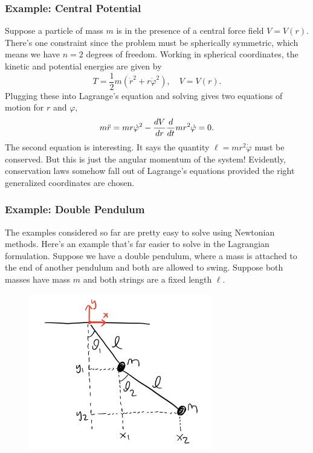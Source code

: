 \documentclass[
  letterpaper,
  DIV=11,
  numbers=noendperiod]{scrreprt}
\begin{document}
\hypertarget{example-central-potential}{%
\subsubsection{Example: Central
Potential}\label{example-central-potential}}

Suppose a particle of mass \(m\) is in the presence of a central force
field \(V=V(r)\). There's one constraint since the problem must be
spherically symmetric, which means we have \(n=2\) degrees of freedom.
Working in spherical coordinates, the kinetic and potential energies are
given by \[
T = \frac{1}{2} m (\dot r^2 + r \dot \varphi^2), \quad V = V(r).
\] Plugging these into Lagrange's equation and solving gives two
equations of motion for \(r\) and \(\varphi\), \[
m \ddot r = mr \dot\varphi^2 - \frac{dV}{dr}\\
\frac{d}{dt} mr^2 \dot\varphi = 0.
\] The second equation is interesting. It says the quantity
\(\ell = mr^2 \dot\varphi\) must be conserved. But this is just the
angular momentum of the system! Evidently, conservation laws somehow
fall out of Lagrange's equations provided the right generalized
coordinates are chosen.

\hypertarget{example-double-pendulum}{%
\subsubsection{Example: Double Pendulum}\label{example-double-pendulum}}

The examples considered so far are pretty easy to solve using Newtonian
methods. Here's an example that's far easier to solve in the Lagrangian
formulation. Suppose we have a double pendulum, where a mass is attached
to the end of another pendulum and both are allowed to swing. Suppose
both masses have mass \(m\) and both strings are a fixed length
\(\ell\).

\begin{figure}

{\centering \includegraphics[width=3.125in,height=\textheight]{classical-mechanics/./resources/image-20230218215415855.png}

}

\end{figure}
\end{document}

